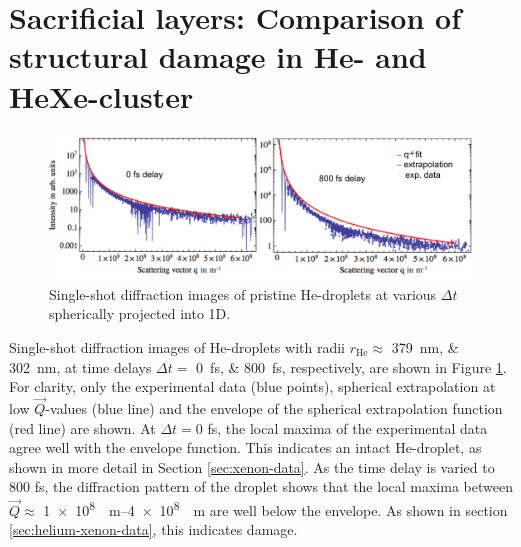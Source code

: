 \section{Sacrificial layers: Comparison of structural damage in He- and HeXe-cluster}\label{sec:comparison-of-He-and-HeXe-clusters}
\begin{figure}
	\centering
		\includegraphics[width=1.00\textwidth]{images/results/He-diffraction-patterns.pdf}
	\caption[Single-shot diffraction images of He-droplets at different time delays]{Single-shot diffraction images of pristine He-droplets at various $\Delta t$ spherically projected into 1D.}
	\label{fig:He-diffraction-patterns}
\end{figure}
Single-shot diffraction images of He-droplets with radii $r_{\text{He}}\approx$ \SIlist{379;302}{\nano\meter}, at time delays $\Delta t=$ \SIlist{0;800}{\femto\second}, respectively, are shown in Figure \ref{fig:He-diffraction-patterns}. For clarity, only the experimental data (blue points), spherical extrapolation at low $\vec{Q}$-values (blue line) and the envelope of the spherical extrapolation function (red line) are shown. At $\Delta t = 0$ fs, the local maxima of the experimental data agree well with the envelope function. This indicates an intact He-droplet, as shown in more detail in Section \ref{sec:xenon-data}. As the time delay is varied to $800$ fs, the diffraction pattern of the droplet shows that the local maxima between $\vec{Q} \approx$ \SIrange[scientific-notation=fixed, fixed-exponent=8]{1e8}{4e8}{\per\meter} are well below the envelope. As shown in section \ref{sec:helium-xenon-data}, this indicates damage.\\[1\baselineskip]
%
